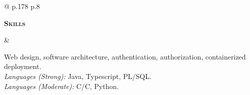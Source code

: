 \documentclass[10pt]{article}
\def\cpp{{C\nolinebreak[4]\hspace{-.05em}\raisebox{.4ex}{\tiny\bf ++}}}
\newcommand{\titlecell}[1]{%
  \begin{minipage}[t]{\linewidth}
    \raggedleft \textbf{#1}
\end{minipage}}
\newcommand{\contentcell}[1]{%
  \begin{minipage}[t]{\linewidth}
    #1
\end{minipage}}
\begin{document}
        \noindent
        \begin{tabular}{@{} p{.178\textwidth} p{.8\textwidth}}
          \titlecell{\textsc{Skills}} &
          \contentcell{
            Web design, software architecture, authentication, authorization, containerized deployment. \\
            {\sl Languages (Strong):} Java, Typescript, PL/SQL. \\
            {\sl Languages (Moderate):} C/\cpp, Python. \\
          }
        \end{tabular}
\end{document}
